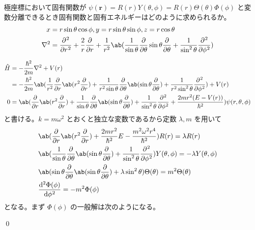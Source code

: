 \documentclass[uplatex,dvipdfmx,a4paper,11pt]{jlreq}
\makeatletter
\newcommand{\rr}{\bm{r}}
\newcommand{\laplacian}{\nabla^2}
\numberwithin{equation}{section}
\theoremstyle{definition}
\renewenvironment{proof}[1][\proofname]{\par
  \normalfont
  \topsep6\p@\@plus6\p@ \trivlist
  \item[\hskip\labelsep{\bfseries #1}\@addpunct{\bfseries}]\ignorespaces\quad\par
}{%
  \qed\endtrivlist\@endpefalse
}
\renewcommand\proofname{証明}
\makeatother
\begin{document}
\begin{problem}
極座標において固有関数が $\psi(\rr) = R(r)Y(\theta, \phi) = R(r)\Theta(\theta)\Phi(\phi)$ と変数分離できるとき固有関数と固有エネルギーはどのように求められるか。
\begin{align}
  x          & = r\sin\theta\cos\phi, y = r\sin\theta\sin\phi, z = r\cos\theta                                                                                                        \\
  \laplacian & = \diffp[2]{}{r} + \frac{2}{r}\diffp{}{r} + \frac{1}{r^2}\ab(\frac{1}{\sin\theta}\diffp{}{\theta}\sin\theta\diffp{}{\theta} + \frac{1}{\sin^2\theta}\diffp[2]{}{\phi})
\end{align}
\end{problem}
\begin{proof}
  \begin{align}
    \hat{H} & = -\frac{\hbar^2}{2m}\laplacian + V(r)                                                                                                                                                                        \\
            & = -\frac{\hbar^2}{2m}\ab(\frac{1}{r^2}\diffp{}{r}\ab(r^2\diffp{}{r}) + \frac{1}{r^2\sin\theta}\diffp{}{\theta}\ab(\sin\theta\diffp{}{\theta}) + \frac{1}{r^2\sin^2\theta}\diffp[2]{}{\phi}) + V(r)            \\
    0       & = \ab(\diffp{}{r}\ab(r^2\diffp{}{r}) + \frac{1}{\sin\theta}\diffp{}{\theta}\ab(\sin\theta\diffp{}{\theta}) + \frac{1}{\sin^2\theta}\diffp[2]{}{\phi} + \frac{2m r^2(E - V(r))}{\hbar^2})\psi(r, \theta, \phi)
  \end{align}
  と書ける。$k = m\omega^2$ とおくと独立な変数であるから定数 $\lambda, m$ を用いて
  \begin{align}
     & \ab(\diffp{}{r}\ab(r^2\diffp{}{r}) + \frac{2m r^2}{\hbar^2}E - \frac{m^2\omega^2r^4}{\hbar^2})R(r) = \lambda R(r)                                             \\
     & \ab(\frac{1}{\sin\theta}\diffp{}{\theta}\ab(\sin\theta\diffp{}{\theta}) + \frac{1}{\sin^2\theta}\diffp[2]{}{\phi}) Y(\theta, \phi) = -\lambda Y(\theta, \phi) \\
     & \ab(\sin\theta\diffp{}{\theta}\ab(\sin\theta\diffp{}{\theta}) + \lambda \sin^2\theta)\Theta(\theta) = m^2\Theta(\theta)                                       \\
     & \diff[2]{\Phi(\phi)}{\phi} = -m^2\Phi(\phi)
  \end{align}
  となる。まず $\Phi(\phi)$ の一般解は次のようになる。

\end{proof}
\end{document}
